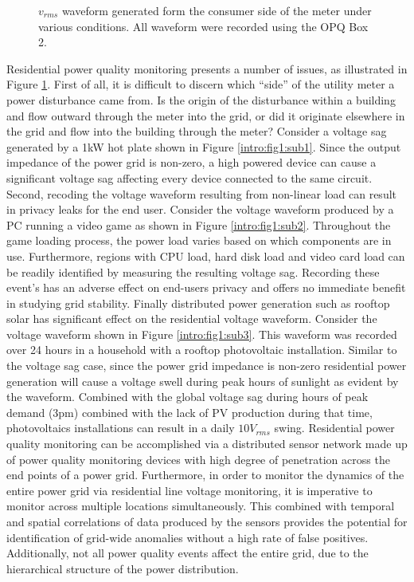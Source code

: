 \begin{figure}[h]
    \caption{$v_{rms}$ waveform generated form the consumer side of the meter under various conditions.
    All waveform were recorded using the OPQ Box 2.}
    \label{intro:fig:1}
\end{figure}

Residential power quality monitoring presents a number of issues, as illustrated in Figure \ref{intro:fig:1}.
First of all, it is difficult to discern which ``side'' of the utility meter a power disturbance came from.
Is the origin of the disturbance within a building and flow outward through the meter into the grid, or did it originate elsewhere in the grid and flow into the building through the meter?
Consider a voltage sag generated by a 1kW hot plate shown in Figure \ref{intro:fig1:sub1}.
Since the output impedance of the power grid is non-zero, a high powered device can cause a significant voltage sag affecting every device connected to the same circuit.
Second, recoding the voltage waveform resulting from non-linear load can result in privacy leaks for the end user.
Consider the voltage waveform produced by a PC running a video game as shown in Figure \ref{intro:fig1:sub2}.
Throughout the game loading process, the power load varies based on which components are in use.
Furthermore, regions with CPU load, hard disk load and video card load can be readily identified by measuring the resulting voltage sag.
Recording these event's has an adverse effect on end-users privacy and offers no immediate benefit in studying grid stability.
Finally distributed power generation such as rooftop solar has significant effect on the residential voltage waveform.
Consider the voltage waveform shown in Figure \ref{intro:fig1:sub3}.
This waveform was recorded over 24 hours in a household with a rooftop photovoltaic installation.
Similar to the voltage sag case, since the power grid impedance is non-zero residential power generation will cause a voltage swell during peak hours of sunlight as evident by the waveform.
Combined with the global voltage sag during hours of peak demand (3pm) combined with the lack of PV production during that time, photovoltaics installations can result in a daily $10V_{rms}$ swing.
Residential power quality monitoring can be accomplished via a distributed sensor network made up of power quality monitoring devices with high degree of penetration across the end points of a power grid.
Furthermore, in order to monitor the dynamics of the entire power grid via residential line voltage monitoring, it is imperative to monitor across multiple locations simultaneously.
This combined with temporal and spatial correlations of data produced by the sensors provides the potential for identification of grid-wide anomalies without a high rate of false positives.
Additionally, not all power quality events affect the entire grid, due to the hierarchical structure of the power distribution.


